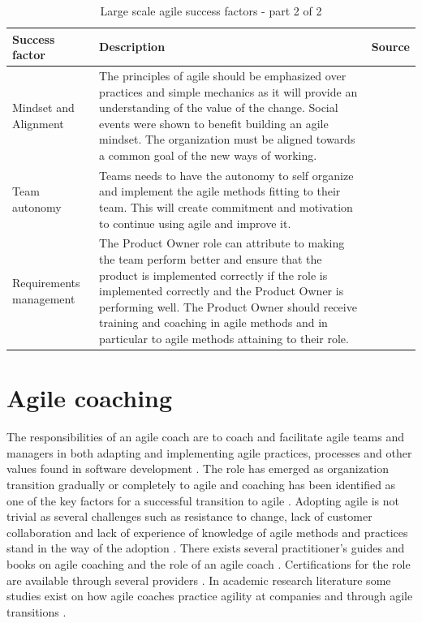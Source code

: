 \documentclass[11pt,a4paper]{report}
\begin{document}
\begin{table}[!ht]
\begin{tabular}{|p{4cm}|p{8cm}|p{1cm}|}
\hline
\textbf{Success factor} & \textbf{Description} & \textbf{Source} \\ \hline
Mindset and Alignment   &  The principles of agile should be emphasized over practices and simple mechanics as it will provide an understanding of the value of the change. Social events were shown to benefit building an agile mindset. The organization must be aligned towards a common goal of the new ways of working. &    \cite{dikert2016challenges}     \\\hline
Team autonomy   &  Teams needs to have the autonomy to self organize and implement the agile methods fitting to their team. This will create commitment and motivation to continue using agile and improve it.  &    \cite{dikert2016challenges}     \\\hline
Requirements management   & The Product Owner role can attribute to making the team perform better and ensure that the product is implemented correctly if the role is implemented correctly and the Product Owner is performing well. The Product Owner should receive training and coaching in agile methods and in particular to agile methods attaining to their role.  &    \cite{dikert2016challenges}     \\\hline
\end{tabular}
\caption{Large scale agile success factors - part 2 of 2}
\label{LargeScaleAgileSuccessFactors2}
\end{table}

\clearpage

\section{Agile coaching}
\label{agileCoachRelatedWork}
The responsibilities of an agile coach are to coach and facilitate agile teams and managers in both adapting and implementing agile practices, processes and other values found in software development \cite{parizi2014hidden}. The role has emerged as organization transition gradually or completely to agile and coaching has been identified as one of the key factors for a successful transition to agile \cite{dikert2016challenges}. Adopting agile is not trivial as several challenges such as resistance to change, lack of customer collaboration and lack of experience of knowledge of agile methods and practices stand in the way of the adoption \cite{dikert2016challenges} \cite{litReviewACRole}. 
There exists several practitioner’s guides and books on agile coaching and the role of an agile coach \cite{davies2009agile} \cite{belling2020agile}. Certifications for the role are available through several providers \cite{icaACCertification} \cite{scrumAllianceACCertification}. In academic research literature some studies exist on how agile coaches practice agility at companies and through agile transitions \cite{hanly2006agile} \cite{silva2007growth} \cite{backlander2019doing}. 
\end{document}
